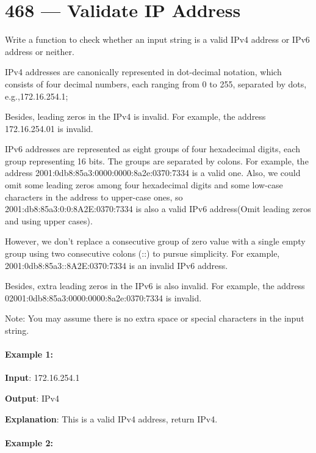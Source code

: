 \section{468 --- Validate IP Address}
Write a function to check whether an input string is a valid IPv4 address or IPv6 address or neither.

IPv4 addresses are canonically represented in dot-decimal notation, which consists of four decimal numbers, each ranging from 0 to 255, separated by dots, e.g.,172.16.254.1;

Besides, leading zeros in the IPv4 is invalid. For example, the address 172.16.254.01 is invalid.

IPv6 addresses are represented as eight groups of four hexadecimal digits, each group representing 16 bits. The groups are separated by colons. For example, the address 2001:0db8:85a3:0000:0000:8a2e:0370:7334 is a valid one. Also, we could omit some leading zeros among four hexadecimal digits and some low-case characters in the address to upper-case ones, so 2001:db8:85a3:0:0:8A2E:0370:7334 is also a valid IPv6 address(Omit leading zeros and using upper cases).

However, we don't replace a consecutive group of zero value with a single empty group using two consecutive colons (::) to pursue simplicity. For example, 2001:0db8:85a3::8A2E:0370:7334 is an invalid IPv6 address.

Besides, extra leading zeros in the IPv6 is also invalid. For example, the address 02001:0db8:85a3:0000:0000:8a2e:0370:7334 is invalid.

Note: You may assume there is no extra space or special characters in the input string.

\paragraph{Example 1:}

\begin{flushleft}
\textbf{Input}: 172.16.254.1

\textbf{Output}: IPv4

\textbf{Explanation}: This is a valid IPv4 address, return IPv4.

\end{flushleft}

\paragraph{Example 2:}


